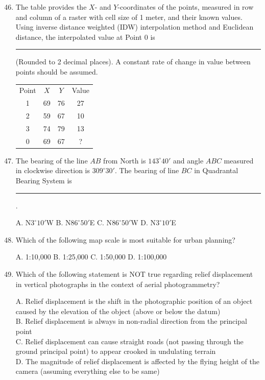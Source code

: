 \documentclass[journal,12pt,onecolumn]{IEEEtran}
\begin{document}
\begin{enumerate}
    \setcounter{enumi}{45}
    \item The table provides the $X$- and $Y$-coordinates of the points, measured in row and column of a raster with cell size of 1 meter, and their known values. Using inverse distance weighted (IDW) interpolation method and Euclidean distance, the interpolated value at Point 0 is \rule{3cm}{0.15mm} (Rounded to 2 decimal places). A constant rate of change in value between points should be assumed.

\begin{tabular}{cccc}
Point & $X$ & $Y$ & Value \\
1 & 69 & 76 & 27 \\
2 & 59 & 67 & 10 \\
3 & 74 & 79 & 13 \\
0 & 69 & 67 & ? \\
\end{tabular}

    \item The bearing of the line $AB$ from North is $143^\circ 40'$ and angle $ABC$ measured in clockwise direction is $309^\circ 30'$. The bearing of line $BC$ in Quadrantal Bearing System is \rule{3cm}{0.15mm}.

    A. N$3^\circ 10'$W \quad
    B. N$86^\circ 50'$E \quad
    C. N$86^\circ 50'$W \quad
    D. N$3^\circ 10'$E

    \item Which of the following map scale is most suitable for urban planning?

    A. 1:10,000 \quad
    B. 1:25,000 \quad
    C. 1:50,000 \quad
    D. 1:100,000

    \item Which of the following statement is NOT true regarding relief displacement in vertical photographs in the context of aerial photogrammetry?

    A. Relief displacement is the shift in the photographic position of an object caused by the elevation of the object (above or below the datum) \\
    B. Relief displacement is always in non-radial direction from the principal point \\
    C. Relief displacement can cause straight roads (not passing through the ground principal point) to appear crooked in undulating terrain \\
    D. The magnitude of relief displacement is affected by the flying height of the camera (assuming everything else to be same)


\end{enumerate}
\end{document}
